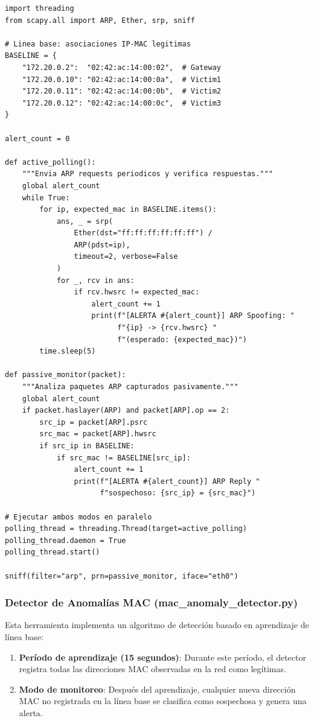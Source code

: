 \documentclass[12pt, a4paper]{article}
\begin{document}
\begin{lstlisting}[style=pythonstyle, caption={Estructura del monitor ARP h\'ibrido (arp\_monitor.py)}]
import threading
from scapy.all import ARP, Ether, srp, sniff

# Linea base: asociaciones IP-MAC legitimas
BASELINE = {
    "172.20.0.2":  "02:42:ac:14:00:02",  # Gateway
    "172.20.0.10": "02:42:ac:14:00:0a",  # Victim1
    "172.20.0.11": "02:42:ac:14:00:0b",  # Victim2
    "172.20.0.12": "02:42:ac:14:00:0c",  # Victim3
}

alert_count = 0

def active_polling():
    """Envia ARP requests periodicos y verifica respuestas."""
    global alert_count
    while True:
        for ip, expected_mac in BASELINE.items():
            ans, _ = srp(
                Ether(dst="ff:ff:ff:ff:ff:ff") /
                ARP(pdst=ip),
                timeout=2, verbose=False
            )
            for _, rcv in ans:
                if rcv.hwsrc != expected_mac:
                    alert_count += 1
                    print(f"[ALERTA #{alert_count}] ARP Spoofing: "
                          f"{ip} -> {rcv.hwsrc} "
                          f"(esperado: {expected_mac})")
        time.sleep(5)

def passive_monitor(packet):
    """Analiza paquetes ARP capturados pasivamente."""
    global alert_count
    if packet.haslayer(ARP) and packet[ARP].op == 2:
        src_ip = packet[ARP].psrc
        src_mac = packet[ARP].hwsrc
        if src_ip in BASELINE:
            if src_mac != BASELINE[src_ip]:
                alert_count += 1
                print(f"[ALERTA #{alert_count}] ARP Reply "
                      f"sospechoso: {src_ip} = {src_mac}")

# Ejecutar ambos modos en paralelo
polling_thread = threading.Thread(target=active_polling)
polling_thread.daemon = True
polling_thread.start()

sniff(filter="arp", prn=passive_monitor, iface="eth0")
\end{lstlisting}

\subsubsection{Detector de Anomal\'ias MAC (mac\_anomaly\_detector.py)}

Esta herramienta implementa un algoritmo de detecci\'on basado en aprendizaje de l\'inea base:

\begin{enumerate}[leftmargin=2cm]
    \item \textbf{Per\'iodo de aprendizaje (15 segundos)}: Durante este per\'iodo, el detector registra todas las direcciones MAC observadas en la red como leg\'itimas.
    \item \textbf{Modo de monitoreo}: Despu\'es del aprendizaje, cualquier nueva direcci\'on MAC no registrada en la l\'inea base se clasifica como sospechosa y genera una alerta.
\end{enumerate}
\end{document}
